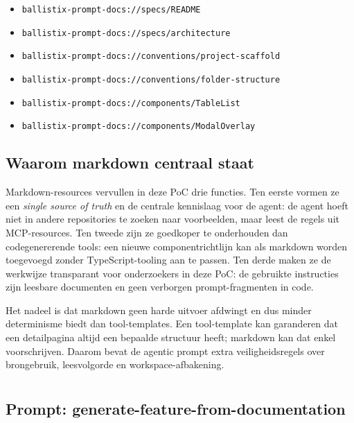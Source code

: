 \begin{itemize}
  \item \texttt{ballistix-prompt-docs://specs/README}
  \item \texttt{ballistix-prompt-docs://specs/architecture}
  \item \texttt{ballistix-prompt-docs://conventions/project-scaffold}
  \item \texttt{ballistix-prompt-docs://conventions/folder-structure}
  \item \texttt{ballistix-prompt-docs://components/TableList}
  \item \texttt{ballistix-prompt-docs://components/ModalOverlay}
\end{itemize}

\subsection{Waarom markdown centraal staat}

Markdown-resources vervullen in deze PoC drie functies. Ten eerste vormen ze een \textit{single source of truth} en de centrale kennislaag voor de agent: de agent hoeft niet in andere repositories te zoeken naar voorbeelden, maar leest de regels uit MCP-resources. Ten tweede zijn ze goedkoper te onderhouden dan codegenererende tools: een nieuwe componentrichtlijn kan als markdown worden toegevoegd zonder TypeScript-tooling aan te passen. Ten derde maken ze de werkwijze transparant voor onderzoekers in deze PoC: de gebruikte instructies zijn leesbare documenten en geen verborgen prompt-fragmenten in code.

Het nadeel is dat markdown geen harde uitvoer afdwingt en dus minder determinisme biedt dan tool-templates. Een tool-template kan garanderen dat een detailpagina altijd een bepaalde structuur heeft; markdown kan dat enkel voorschrijven. Daarom bevat de agentic prompt extra veiligheidsregels over brongebruik, leesvolgorde en workspace-afbakening.

\section{}
\label{sec:poc-agentic-prompt}

\subsection{Prompt: generate-feature-from-documentation}

